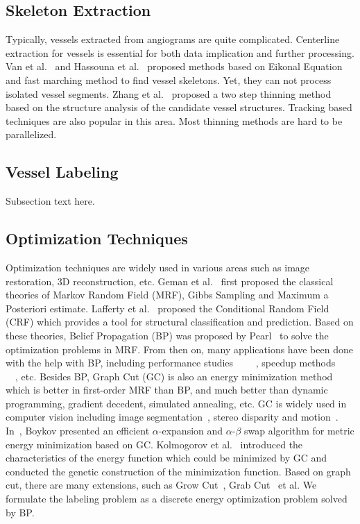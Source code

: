 \documentclass[journal]{IEEEtran}
\begin{document}
\subsection{Skeleton Extraction}
Typically, vessels extracted from angiograms are quite complicated.  Centerline extraction for vessels is essential for both data implication and further processing. Van et al.~\cite{van2007subvoxel} and Hassouna et al.~\cite{Hassouna2007} proposed methods based on Eikonal Equation and fast marching method to find vessel skeletons. Yet, they can not process isolated vessel segments. Zhang et al.~\cite{two_step_thinning} proposed a two step thinning method based on the structure analysis of the candidate vessel structures. Tracking based techniques are also popular in this area. Most thinning methods are hard to be parallelized.

\subsection{Vessel Labeling}
Subsection text here.

\subsection{Optimization Techniques}
Optimization techniques are widely used in various areas such as image restoration, 3D reconstruction, etc. Geman et al.~\cite{geman1984stochastic} first proposed the classical theories of Markov Random Field (MRF), Gibbs Sampling and Maximum a Posteriori estimate. Lafferty et al.~\cite{lafferty2001conditional} proposed the Conditional Random Field (CRF) which provides a tool for structural classification and prediction. Based on these theories, Belief Propagation (BP) was proposed by Pearl~\cite{pearl1982reverend} to solve the optimization problems in MRF. From then on, many applications have been done with the help with BP, including performance studies~\cite{Meltzer2005}~\cite{murphy1999loopy} ~\cite{szeliski2008comparative}~\cite{tappen2003comparison}, speedup methods~\cite{potetz2008efficient}~\cite{brunton2006belief} ~\cite{coughlan2007dynamic}~\cite{felzenszwalb2006efficient}, etc. Besides BP, Graph Cut (GC) is also an energy minimization method which is better in first-order MRF than BP, and much better than dynamic programming, gradient decedent, simulated annealing, etc. GC is widely used in computer vision including image segmentation~\cite{boykov2001interactive}, stereo disparity and motion~\cite{boykov2001fast}. In~\cite{boykov2001fast}, Boykov presented an efficient $\alpha$-expansion and $\alpha$-$\beta$ swap algorithm for metric energy minimization based on GC. Kolmogorov et al.~\cite{kolmogorov2004energy} introduced the characteristics of the energy function which could be minimized by GC and conducted the genetic construction of the minimization function. Based on graph cut, there are many extensions, such as Grow Cut~\cite{vezhnevets2005growcut}, Grab Cut~\cite{rother2004grabcut} et al. We formulate the labeling problem as a discrete energy optimization problem solved by BP.
\end{document}
